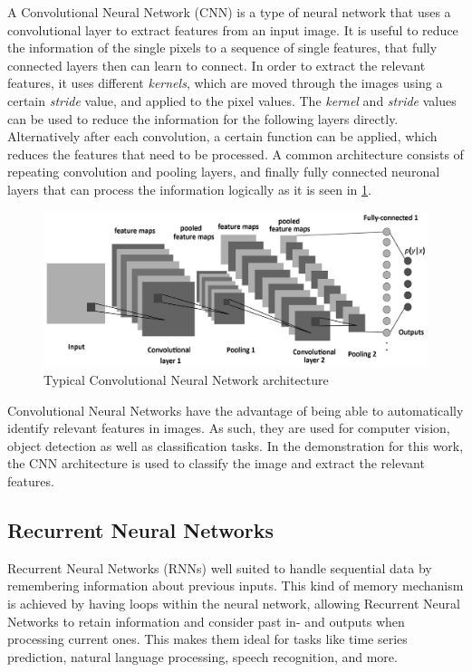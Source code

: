\documentclass[12pt, a4paper, titlepage]{report}
\begin{document}
A Convolutional Neural Network (CNN) is a type of neural network that uses a convolutional layer to extract features from an input image. It is useful to reduce the information of the single pixels to a sequence of single features, that fully connected layers then can learn to connect. In order to extract the relevant features, it uses different \emph{kernels}, which are moved through the images using a certain \emph{stride} value, and applied to the pixel values. The \emph{kernel} and \emph{stride} values can be used to reduce the information for the following layers directly. Alternatively after each convolution, a certain function can be applied, which reduces the features that need to be processed. A common architecture consists of repeating convolution and pooling layers, and finally fully connected neuronal layers that can process the information logically as it is seen in \ref{fig:cnn_architecture}.

\begin{figure}
	\centering
	\includegraphics[width=1.0\textwidth]{../rc/images/cnn_architecture.png}
   \caption{Typical Convolutional Neural Network architecture \cite{img_cnn_architecture}}
	\label{fig:cnn_architecture}
\end{figure}


Convolutional Neural Networks have the advantage of being able to automatically identify relevant features in images. As such, they are used for computer vision, object detection as well as classification tasks. In the demonstration for this work, the CNN architecture is used to classify the image and extract the relevant features.


\subsection{Recurrent Neural Networks}

Recurrent Neural Networks (RNNs) well suited to handle sequential data by remembering information about previous inputs. This kind of memory mechanism is achieved by having loops within the neural network, allowing Recurrent Neural Networks to retain information and consider past in- and outputs when processing current ones. This makes them ideal for tasks like time series prediction, natural language processing, speech recognition, and more.
\end{document}
